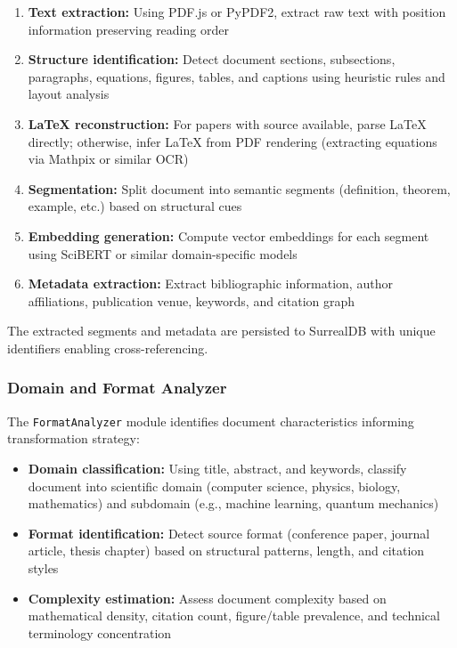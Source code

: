 \documentclass{ieeeaccess}
\begin{document}
\begin{enumerate}
\item \textbf{Text extraction:} Using PDF.js or PyPDF2, extract raw text with position information preserving reading order
\item \textbf{Structure identification:} Detect document sections, subsections, paragraphs, equations, figures, tables, and captions using heuristic rules and layout analysis
\item \textbf{LaTeX reconstruction:} For papers with source available, parse LaTeX directly; otherwise, infer LaTeX from PDF rendering (extracting equations via Mathpix or similar OCR)
\item \textbf{Segmentation:} Split document into semantic segments (definition, theorem, example, etc.) based on structural cues
\item \textbf{Embedding generation:} Compute vector embeddings for each segment using SciBERT or similar domain-specific models
\item \textbf{Metadata extraction:} Extract bibliographic information, author affiliations, publication venue, keywords, and citation graph
\end{enumerate}

The extracted segments and metadata are persisted to SurrealDB with unique identifiers enabling cross-referencing.

\subsubsection{Domain and Format Analyzer}

The \texttt{FormatAnalyzer} module identifies document characteristics informing transformation strategy:

\begin{itemize}
\item \textbf{Domain classification:} Using title, abstract, and keywords, classify document into scientific domain (computer science, physics, biology, mathematics) and subdomain (e.g., machine learning, quantum mechanics)
\item \textbf{Format identification:} Detect source format (conference paper, journal article, thesis chapter) based on structural patterns, length, and citation styles
\item \textbf{Complexity estimation:} Assess document complexity based on mathematical density, citation count, figure/table prevalence, and technical terminology concentration
\end{itemize}
\end{document}
